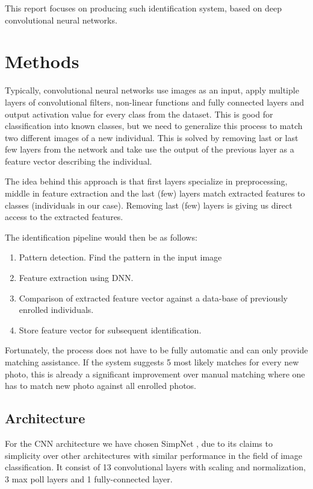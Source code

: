 \documentclass[fleqn,moreauthors,10pt]{ds_report}
\begin{document}
This report focuses on producing such identification system, based on deep convolutional neural networks.

\section*{Methods}

Typically, convolutional neural networks use images as an input, apply multiple layers of convolutional filters, non-linear functions and fully connected layers and output activation value for every class from the dataset. This is good for classification into known classes, but we need to generalize this process to match two different images of a new individual. This is solved by removing last or last few layers from the network and take use the output of the previous layer as a feature vector describing the individual.

The idea behind this approach is that first layers specialize in preprocessing, middle in feature extraction and the last (few) layers match extracted features to classes (individuals in our case). Removing last (few) layers is giving us direct access to the extracted features.

The identification pipeline would then be as follows:
\begin{enumerate}
	\item Pattern detection. Find the pattern in the input image
	\item Feature extraction using DNN.
	\item Comparison of extracted feature vector against a data-base of previously enrolled individuals.
	\item Store feature vector for subsequent identification.
\end{enumerate}

Fortunately, the process does not have to be fully automatic and can only provide matching assistance. If the system suggests 5 most likely matches for every new photo, this is already a significant improvement over manual matching where one has to match new photo against all enrolled photos.

\subsection*{Architecture}

For the CNN architecture we have chosen SimpNet \cite{simpnet}, due to its claims to simplicity over other architectures with similar performance in the field of image classification. It consist of 13 convolutional layers with scaling and normalization, 3 max poll layers and 1 fully-connected layer.
\end{document}
